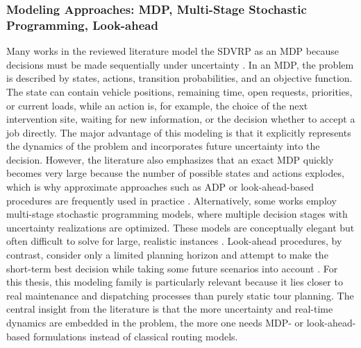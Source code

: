 \documentclass[12pt,oneside]{article}
\begin{document}
\subsubsection{Modeling Approaches: MDP, Multi-Stage Stochastic Programming, Look-ahead}
Many works in the reviewed literature model the SDVRP as an MDP because decisions must be made sequentially under uncertainty \citep[e.g.,][]{ulmer2019offline}. In an MDP, the problem is described by states, actions, transition probabilities, and an objective function. The state can contain vehicle positions, remaining time, open requests, priorities, or current loads, while an action is, for example, the choice of the next intervention site, waiting for new information, or the decision whether to accept a job directly.
The major advantage of this modeling is that it explicitly represents the dynamics of the problem and incorporates future uncertainty into the decision. However, the literature also emphasizes that an exact MDP quickly becomes very large because the number of possible states and actions explodes, which is why approximate approaches such as ADP or look-ahead-based procedures are frequently used in practice \citep{ulmer2019offline}.
Alternatively, some works employ multi-stage stochastic programming models, where multiple decision stages with uncertainty realizations are optimized. These models are conceptually elegant but often difficult to solve for large, realistic instances \citep{ritzinger2016survey}. Look-ahead procedures, by contrast, consider only a limited planning horizon and attempt to make the short-term best decision while taking some future scenarios into account \citep{zou2018look}.
For this thesis, this modeling family is particularly relevant because it lies closer to real maintenance and dispatching processes than purely static tour planning. The central insight from the literature is that the more uncertainty and real-time dynamics are embedded in the problem, the more one needs MDP- or look-ahead-based formulations instead of classical routing models.
\end{document}
